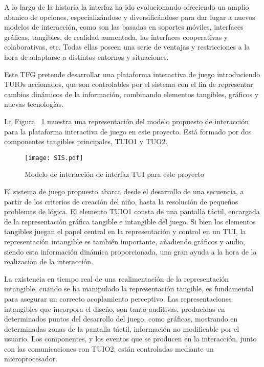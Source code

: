 A lo largo de la historia la interfaz ha ido evolucionando ofreciendo un amplio abanico de opciones, especializándose y diversificándose para dar lugar a nuevos modelos de interacción, como son las basadas en soportes móviles, interfaces gráficas, tangibles, de realidad aumentada, las interfaces cooperativas y colaborativas, etc. Todas ellas poseen una serie de ventajas y restricciones a la hora de adaptarse a distintos entornos y situaciones.

Este TFG pretende desarrollar una plataforma interactiva de juego introduciendo TUIOs accionados, que son controlables por el sistema con el fin de representar cambios dinámicos de la información, combinando elementos tangibles, gráficos y nuevas tecnologías.

La Figura ~\ref{fig:SIS} muestra una representación del modelo propuesto de interacción para la plataforma interactiva de juego en este proyecto. Está formado por dos componentes tangibles principales, TUIO1 y TUO2.

\begin{figure}[!h]
\begin{center}
\texttt{[image: SIS.pdf]}
\caption{Modelo de interacción de interfaz TUI para este proyecto}
\label{fig:SIS}
\end{center}
\end{figure}

El sistema de juego propuesto abarca desde el desarrollo de una secuencia, a partir de los criterios de creación del niño, hasta la resolución de pequeños problemas de lógica. El elemento TUIO1 consta de una pantalla táctil, encargada de la representación gráfica tangible e intangible del juego. Si bien los elementos tangibles juegan el papel central en la representación y control en un TUI, la representación intangible es también importante, añadiendo gráficos y audio, siendo esta información dinámica proporcionada, una gran ayuda a la hora de la realización de la interacción. 

La existencia en tiempo real de una realimentación de la representación intangible, cuando se ha manipulado la representación tangible, es fundamental para asegurar un correcto acoplamiento perceptivo. Las representaciones intangibles que incorpora el diseño, son tanto auditivas, producidas en determinados puntos del desarrollo del juego, como gráficas, mostrando en determinadas zonas de la pantalla táctil, información no modificable por el usuario.
Los componentes, y los eventos que se producen en la interacción, junto con las comunicaciones con TUIO2, están controladas mediante un microprocesador.

